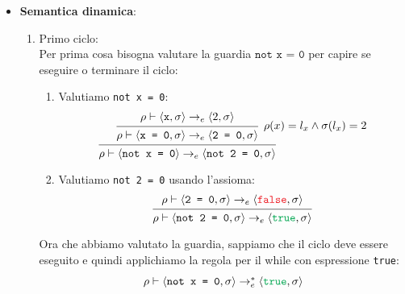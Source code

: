 \documentclass[a4paper]{article}
\begin{document}
\begin{example}
\begin{itemize}
    \item \textbf{Semantica dinamica}:
      \begin{enumerate}
        \item Primo ciclo:\\
          Per prima cosa bisogna valutare la guardia \( \texttt{not x = 0} \)
          per capire se eseguire o terminare il ciclo:
          \begin{enumerate}
            \item Valutiamo \texttt{not x = 0}:
              \[
                \begin{prooftree}
                  \hypo{ 
                    \rho \vdash \left<\texttt{x}, \sigma \right> \to_e \left< 2, \sigma \right>
                  }
                  \infer1[\( 
                    \rho(x) = l_x \land \sigma(l_x) = 2
                  \)]{  
                    \rho \vdash \left< \texttt{x = 0}, \sigma \right>
                    \to_e
                    \left< \texttt{2 = 0}, \sigma \right>
                  }
                  \infer1{ 
                    \rho \vdash \left< \texttt{not x = 0} \right>
                    \to_e
                    \left< \texttt{not 2 = 0}, \sigma \right>
                  }
                \end{prooftree}
              \] 
            \item Valutiamo \texttt{not 2 = 0} usando l'assioma:
              \[
                \begin{prooftree}
                  \hypo{ 
                    \rho \vdash \left< \texttt{2 = 0}, \sigma \right>
                    \to_e
                    \left< \texttt{\textcolor{Red}{false}}, \sigma \right>
                  }
                  \infer1{ 
                    \rho \vdash \left<\texttt{not 2 = 0}, \sigma \right>
                    \to_e
                    \left< \texttt{\textcolor{Green}{true}}, \sigma \right>
                  }
                \end{prooftree}
              \] 
          \end{enumerate}
          Ora che abbiamo valutato la guardia, sappiamo che il ciclo deve essere eseguito
          e quindi applichiamo la regola per il while con espressione \texttt{true}:
          \[
            \begin{prooftree}
              \hypo{ 
                \rho \vdash \left< \texttt{not x = 0}, \sigma \right>
                \to^*_e
                \left< \texttt{\textcolor{Green}{true}}, \sigma \right>
              }

\end{prooftree}\]
\end{enumerate}
\end{itemize}
\end{example}
\end{document}
